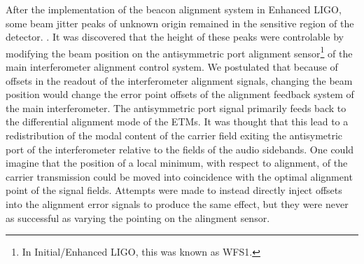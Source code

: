 After the implementation of the beacon alignment system in Enhanced LIGO, some beam jitter peaks of unknown origin remained in the sensitive region of the detector. %
. %
It was discovered that the height of these peaks were controlable by modifying the beam position on the antisymmetric port alignment sensor\footnote{In Initial/Enhanced LIGO, this was known as WFS1.} of the main interferometer alignment control system. %
We postulated that because of offsets in the readout of the interferometer alignment signals, changing the beam position would change the error point offsets of the alignment feedback system of the main interferometer. %
The antisymmetric port signal primarily feeds back to the differential alignment mode of the ETMs. %
It was thought that this lead to a redistribution of the modal content of the carrier field exiting the antisymetric port of the interferometer relative to the fields of the audio sidebands. %
One could imagine that the position of a local minimum, with respect to alignment, of the carrier transmission could be moved into coincidence with the optimal alignment point of the signal fields. %
Attempts were made to instead directly inject offsets into the alignment error signals to produce the same effect, but they were never as successful as varying the pointing on the alingment sensor.
